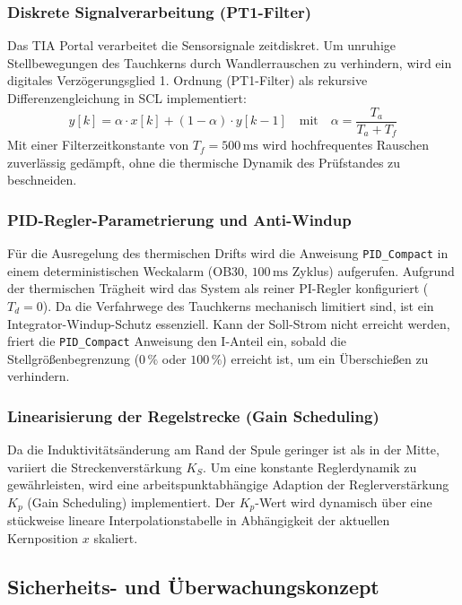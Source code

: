 \subsubsection{Diskrete Signalverarbeitung (PT1-Filter)}
Das TIA Portal verarbeitet die Sensorsignale zeitdiskret. Um unruhige Stellbewegungen des Tauchkerns durch Wandlerrauschen zu verhindern, wird ein digitales Verzögerungsglied 1. Ordnung (PT1-Filter) als rekursive Differenzengleichung in SCL implementiert:
\begin{equation}
    y[k] = \alpha \cdot x[k] + (1 - \alpha) \cdot y[k-1] \quad \text{mit} \quad \alpha = \frac{T_a}{T_a + T_f}
\end{equation}
Mit einer Filterzeitkonstante von $T_f = 500\,\text{ms}$ wird hochfrequentes Rauschen zuverlässig gedämpft, ohne die thermische Dynamik des Prüfstandes zu beschneiden.

\subsubsection{PID-Regler-Parametrierung und Anti-Windup}
Für die Ausregelung des thermischen Drifts wird die Anweisung \texttt{PID\_Compact} in einem deterministischen Weckalarm (OB30, $100\,\text{ms}$ Zyklus) aufgerufen. Aufgrund der thermischen Trägheit wird das System als reiner PI-Regler konfiguriert ($T_d = 0$). 
Da die Verfahrwege des Tauchkerns mechanisch limitiert sind, ist ein Integrator-Windup-Schutz essenziell. Kann der Soll-Strom nicht erreicht werden, friert die \texttt{PID\_Compact} Anweisung den I-Anteil ein, sobald die Stellgrößenbegrenzung ($0\,\%$ oder $100\,\%$) erreicht ist, um ein Überschießen zu verhindern.

\subsubsection{Linearisierung der Regelstrecke (Gain Scheduling)}
Da die Induktivitätsänderung am Rand der Spule geringer ist als in der Mitte, variiert die Streckenverstärkung $K_S$. Um eine konstante Reglerdynamik zu gewährleisten, wird eine arbeitspunktabhängige Adaption der Reglerverstärkung $K_p$ (Gain Scheduling) implementiert. Der $K_p$-Wert wird dynamisch über eine stückweise lineare Interpolationstabelle in Abhängigkeit der aktuellen Kernposition $x$ skaliert.


\subsection{Sicherheits- und Überwachungskonzept}
\label{sec:sicherheitskonzept}

